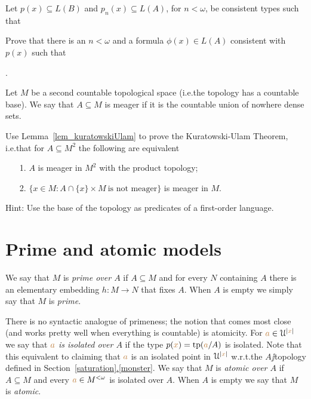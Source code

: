\documentclass[creche.tex]{subfiles}
\begin{document}
\begin{exercise}
Let $p(x)\subseteq L(B)$ and $p_n(x)\subseteq L(A)$, for $n<\omega$, be consistent types such that\smallskip


\noindent Prove that there is an $n<\omega$ and a formula $\phi(x)\in L(A)$ consistent with $p(x)$ such that \smallskip

.\QED
\end{exercise}

\begin{exercise}
Let $M$ be a second countable topological space (i.e.\@ the topology has a countable base).
We say that $A\subseteq M$ is meager if it is the countable union of nowhere dense sets.

Use Lemma~\ref{lem_kuratowskiUlam} to prove the Kuratowski-Ulam Theorem, i.e.\@ that for $A\subseteq M^2$ the following are equivalent
\begin{itemize}
\item[1.] $A$ is meager in $M^2$  with the product topology;
\item[2.] $\Big\{x\in M : A\cap \{x\}{\times}M \ \textrm{is not meager}\Big\}$ is meager in $M$.
\end{itemize}
Hint: Use the base of the topology as predicates of a first-order language.\QED
\end{exercise}


\section{Prime and atomic models}

We say that $M$ is \emph{prime over $A$\/} if $A\subseteq M$ and for every $N$ containing $A$ there is an elementary embedding $h:M\to N$ that fixes $A$.
When $A$ is empty we simply say that $M$ is \emph{prime}.


There is no syntactic analogue of primeness; the notion that comes most close (and works pretty well when everything is countable) is atomicity.
For ${\color{brown} a}\in\EuScript U^{|{\color{brown} x}|}$ we say that \emph{${\color{brown} a}$ is isolated over $A$\/} if the type $p({\color{brown} x})={\rm tp}({\color{brown} a}/A)$ is isolated.
Note that this equivalent to claiming that ${\color{brown} a}$ is an isolated point in $\EuScript U^{|{\color{brown} x}|}$ w.r.t.\@ the $A\jj$topology defined in Section~\hyperref[saturation]{\ref*{saturation}.\ref*{monster}}.
We say that $M$ is \emph{atomic over $A$\/} if $A\subseteq M$ and every ${\color{brown} a}\in M^{<\omega}$ is isolated over $A$.
When $A$ is empty we say that $M$ is \emph{atomic}.
\end{document}
